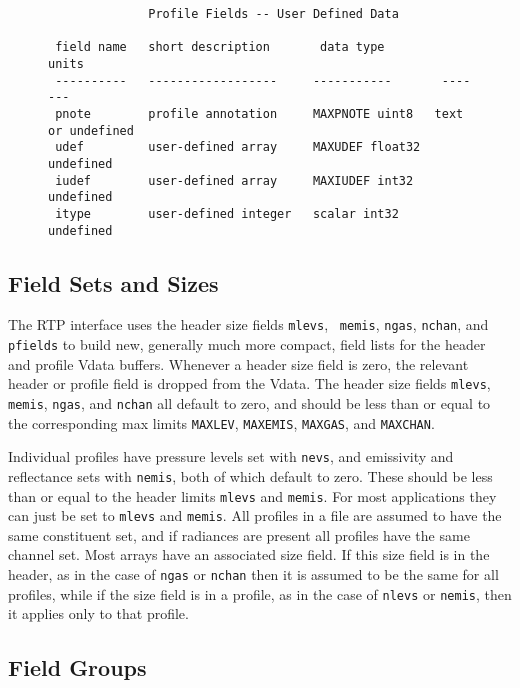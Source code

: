 \documentclass[11pt]{article}
\begin{document}
\begin{figure}
{\footnotesize
\begin{verbatim}
              Profile Fields -- User Defined Data
  
 field name   short description       data type         units
 ----------   ------------------     -----------       -------
 pnote        profile annotation     MAXPNOTE uint8   text or undefined
 udef         user-defined array     MAXUDEF float32  undefined
 iudef        user-defined array     MAXIUDEF int32   undefined
 itype        user-defined integer   scalar int32     undefined

\end{verbatim}
}
\end{figure}

\subsection{Field Sets and Sizes}

The RTP interface uses the header size fields {\tt mlevs}, {\tt
  memis}, {\tt ngas}, {\tt nchan}, and {\tt pfields} to build new,
generally much more compact, field lists for the header and profile
Vdata buffers.  Whenever a header size field is zero, the relevant
header or profile field is dropped from the Vdata.  The header size
fields {\tt mlevs}, {\tt memis}, {\tt ngas}, and {\tt nchan} all
default to zero, and should be less than or equal to the
corresponding max limits {\tt MAXLEV}, {\tt MAXEMIS}, {\tt MAXGAS},
and {\tt MAXCHAN}.

Individual profiles have pressure levels set with {\tt nevs}, and
emissivity and reflectance sets with {\tt nemis}, both of which
default to zero.  These should be less than or equal to the header
limits {\tt mlevs} and {\tt memis}.  For most applications they can
just be set to {\tt mlevs} and {\tt memis}.  All profiles in a file
are assumed to have the same constituent set, and if radiances are
present all profiles have the same channel set.  Most arrays have an
associated size field.  If this size field is in the header, as in
the case of {\tt ngas} or {\tt nchan} then it is assumed to be the
same for all profiles, while if the size field is in a profile, as
in the case of {\tt nlevs} or {\tt nemis}, then it applies only to
that profile.

\subsection{Field Groups}
\end{document}
